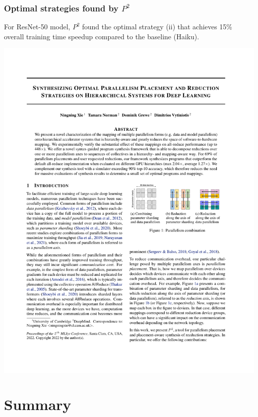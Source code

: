 \documentclass[12pt,aspectratio=169]{beamer}
\begin{document}
    \begin{frame}
        \frametitle{Optimal strategies found by $P^2$}

        For ResNet-50 model, $P^2$ found the optimal strategy (ii) that achieves 15\% overall training time speedup
        compared to the baseline (Haiku).

        \centering
        \includegraphics[page=9,trim=10.8cm 14.5cm 2cm 11.2cm,clip,scale=1]{p2.pdf}
    \end{frame}


    \section{Summary}
\end{document}
